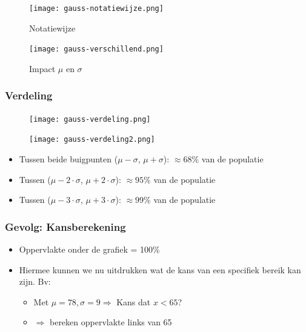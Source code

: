 \documentclass{article}
\begin{document}
\begin{figure}[H]
    \centering
    \texttt{[image: gauss-notatiewijze.png]}
    \caption{Notatiewijze}
\end{figure}

\begin{figure}[H]
    \centering
    \texttt{[image: gauss-verschillend.png]}
    \caption{Impact $\mu$ en $\sigma$}
\end{figure}

\subsubsection{Verdeling}

\begin{figure}[H]
    \centering
    \texttt{[image: gauss-verdeling.png]}
\end{figure}

\begin{figure}[H]
    \centering
    \texttt{[image: gauss-verdeling2.png]}
\end{figure}


\begin{itemize}
    \item Tussen beide buigpunten ($\mu - \sigma$, $\mu + \sigma$): $\approx68\%$ van de populatie
    \item Tussen ($\mu - 2\cdot\sigma$, $\mu + 2\cdot\sigma$): $\approx95\%$ van de populatie
    \item Tussen ($\mu - 3\cdot\sigma$, $\mu + 3\cdot\sigma$): $\approx99\%$ van de populatie
\end{itemize}

\subsubsection{Gevolg: Kansberekening}

\begin{itemize}
    \item Oppervlakte onder de grafiek = 100\%
    \item Hiermee kunnen we nu uitdrukken wat de kans van een specifiek bereik kan zijn. Bv:
    \begin{itemize}
        \item Met $\mu = 78, \sigma = 9 \Rightarrow $ Kans dat $x < 65$? 
        \item $\Rightarrow$ bereken oppervlakte links van 65
    \end{itemize}
\end{itemize}
\end{document}
